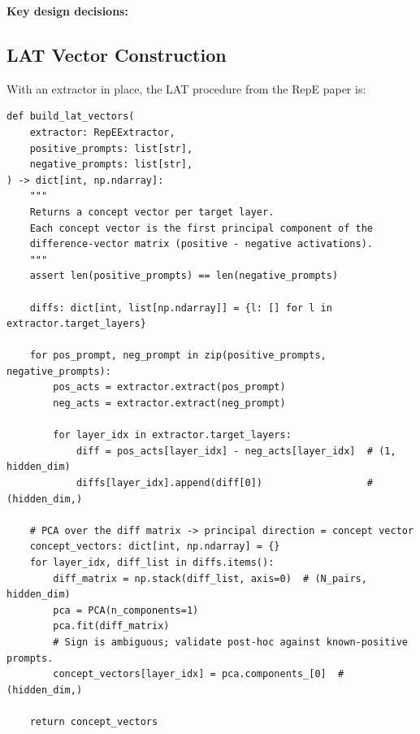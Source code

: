\documentclass[11pt, a4paper]{article}
\newcommand{\ic}[1]{\texttt{\small\colorbox{lightgray}{\strut #1}}}
\begin{document}
\textbf{Key design decisions:}

\subsection{LAT Vector Construction}

With an extractor in place, the LAT procedure from the RepE paper is:

\begin{codebox}
\begin{lstlisting}[style=python]
def build_lat_vectors(
    extractor: RepEExtractor,
    positive_prompts: list[str],
    negative_prompts: list[str],
) -> dict[int, np.ndarray]:
    """
    Returns a concept vector per target layer.
    Each concept vector is the first principal component of the
    difference-vector matrix (positive - negative activations).
    """
    assert len(positive_prompts) == len(negative_prompts)

    diffs: dict[int, list[np.ndarray]] = {l: [] for l in extractor.target_layers}

    for pos_prompt, neg_prompt in zip(positive_prompts, negative_prompts):
        pos_acts = extractor.extract(pos_prompt)
        neg_acts = extractor.extract(neg_prompt)

        for layer_idx in extractor.target_layers:
            diff = pos_acts[layer_idx] - neg_acts[layer_idx]  # (1, hidden_dim)
            diffs[layer_idx].append(diff[0])                  # (hidden_dim,)

    # PCA over the diff matrix -> principal direction = concept vector
    concept_vectors: dict[int, np.ndarray] = {}
    for layer_idx, diff_list in diffs.items():
        diff_matrix = np.stack(diff_list, axis=0)  # (N_pairs, hidden_dim)
        pca = PCA(n_components=1)
        pca.fit(diff_matrix)
        # Sign is ambiguous; validate post-hoc against known-positive prompts.
        concept_vectors[layer_idx] = pca.components_[0]  # (hidden_dim,)

    return concept_vectors
\end{lstlisting}
\end{codebox}
\end{document}
